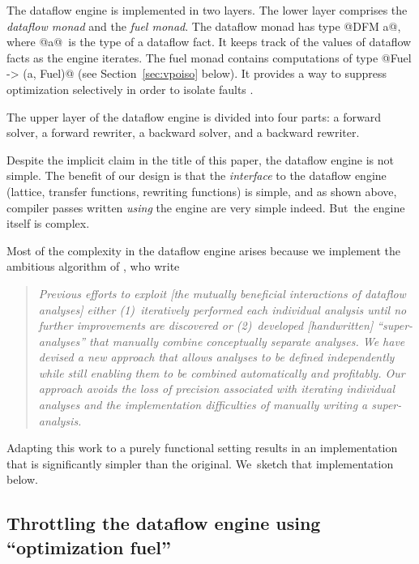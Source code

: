 \documentclass[blockstyle,preprint,nocopyrightspace]{sigplanconf}
\let\cite\citep
\newcommand\secref[1]{Section~\ref{sec:#1}}
\begin{document}
The dataflow engine is implemented in two layers.
The lower layer comprises the \emph{dataflow monad} and the \emph{fuel monad}.
The dataflow monad has type @DFM a@, where @a@~is the type of a
dataflow fact.
It keeps track of the values of dataflow facts as the
engine iterates.
The fuel monad contains
computations of type @Fuel -> (a, Fuel)@ (see \secref{vpoiso} below).
It provides a way to suppress
optimization selectively in order to isolate faults \cite{whalley:isolation}.

The upper layer of the dataflow engine is divided into four parts:
a forward solver, a forward rewriter,
a backward solver, and a backward rewriter.

Despite the implicit claim in the title of this paper,
the dataflow engine is not simple.
The benefit of our design is that the \emph{interface} to the dataflow
engine (lattice, transfer functions, rewriting functions) is simple,
and as shown above, compiler passes written \emph{using} the engine
are very simple indeed.
But~the engine itself is complex.

Most of the complexity in the dataflow engine arises because we
implement the ambitious algorithm of
\citet{lerner-grove-chambers:2002}, who write
\begin{quote}
\emph{Previous efforts to exploit [the mutually beneficial
interactions of dataflow analyses] either (1)~iteratively performed
each individual analysis until no further improvements are discovered
or (2)~developed [handwritten] ``super-analyses'' that manually
combine conceptually separate analyses. We have devised a new approach
that allows analyses to be defined independently while still enabling
them to be combined automatically and profitably. Our approach avoids
the loss of precision associated with iterating individual analyses
and the implementation difficulties of manually writing a
super-analysis.}
\end{quote}
Adapting this work to a purely functional setting results in an
implementation that is significantly simpler than the original.
We~sketch that implementation below.



\subsection{Throttling the dataflow engine using ``optimization
  fuel''}
\end{document}
